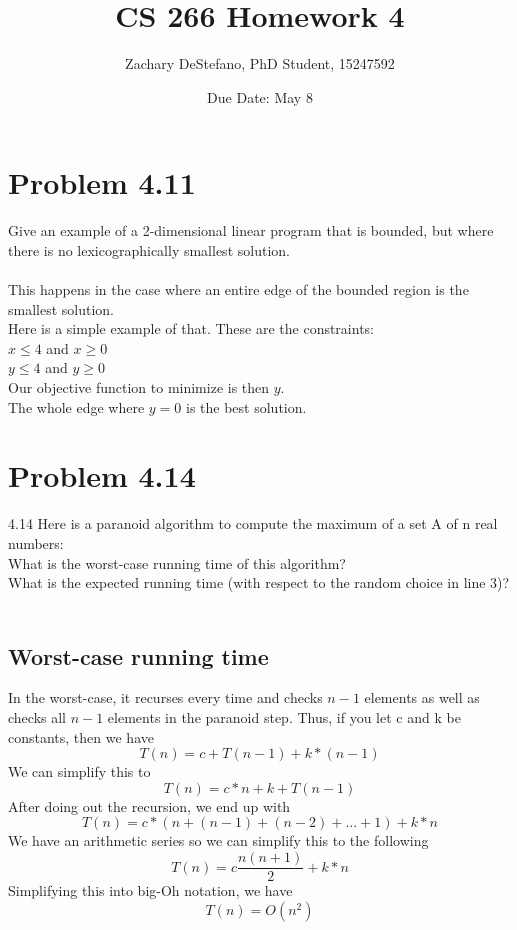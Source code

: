 \documentclass[11pt,psfig]{article}
\begin{document}
\setlength{\parskip}{1.2ex plus0.3ex minus 0.3ex}


\thispagestyle{empty} \pagestyle{myheadings} 



\title{CS 266 Homework 4}
\author{Zachary DeStefano, PhD Student, 15247592}
\date{Due Date: May 8}

\maketitle

\vfill\eject

\section*{Problem 4.11}

Give an example of a 2-dimensional linear program that is bounded, but
where there is no lexicographically smallest solution.\\
\\
This happens in the case where an entire edge of the bounded region is the smallest solution. \\
Here is a simple example of that. These are the constraints: \\
$x \leq 4$ and $x \geq 0$\\
$y \leq 4$ and $y \geq 0$\\
Our objective function to minimize is then $y$. \\
The whole edge where $y=0$ is the best solution. \\

\section*{Problem 4.14}

4.14 Here is a paranoid algorithm to compute the maximum of a set A of n real
numbers:\\
What is the worst-case running time of this algorithm? \\
What is the expected running time (with respect to the random choice in line 3)?\\
\\
\subsection*{Worst-case running time}
In the worst-case, it recurses every time and checks $n-1$ elements as well as checks all $n-1$ elements in the paranoid step. Thus, if you let c and k be constants, then we have
\[
T(n) = c + T(n-1) + k*(n-1)
\]
We can simplify this to 
\[
T(n) = c*n + k + T(n-1)
\]
After doing out the recursion, we end up with
\[
T(n) = c*( n + (n-1) + (n-2) + ... + 1 ) + k*n
\]
We have an arithmetic series so we can simplify this to the following
\[
T(n) = c \frac{n(n+1)}{2} + k*n
\]
Simplifying this into big-Oh notation, we have
\[
T(n) = O(n^2)
\]
\end{document}
